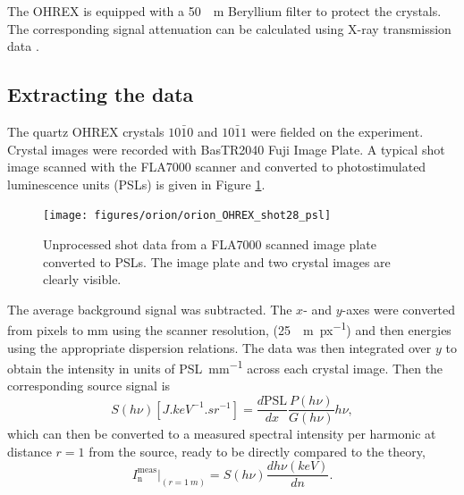 The OHREX is equipped with a \qty{50}{\mu m} Beryllium filter to protect the crystals. The corresponding signal attenuation can be calculated using X-ray transmission data \cite{henkeXRayInteractionsPhotoabsorption1993}.

\subsection{Extracting the data}
The quartz OHREX crystals $10\bar{1}0$ and $10\bar{1}1$ were fielded on the experiment. Crystal images were recorded with BasTR2040 Fuji Image Plate. A typical shot image scanned with the FLA7000 scanner and converted to photostimulated luminescence units (PSLs) is given in Figure \ref{fig:orionohrexshot28psl}.
\begin{figure}
	\centering
	\texttt{[image: figures/orion/orion\_OHREX\_shot28\_psl]}
	\caption[Unprocessed IP from ORION experiment]{Unprocessed shot data from a FLA7000 scanned image plate converted to PSLs. The image plate and two crystal images are clearly visible.}
	\label{fig:orionohrexshot28psl}
\end{figure}
The average background signal was subtracted. The $x$- and $y$-axes were converted from pixels to mm using the scanner resolution, (\qty{25}{\mu m.px^{-1}}) and then energies using the appropriate dispersion relations. The data was then integrated over $y$ to obtain the intensity in units of \unit{PSL.mm^{-1}} across each crystal image. Then the corresponding source signal is
\begin{equation}
	S(h\nu)[\unit{J.keV^{-1}.sr^{-1}}] = \frac{d\mathrm{PSL}}{dx}\frac{P(h\nu)}{G(h\nu)}h\nu,
\end{equation}
which can then be converted to a measured spectral intensity per harmonic at distance $r=1$ from the source, ready to be directly compared to the theory,
\begin{equation}
	I^\mathrm{meas}_\mathrm{n}|_{(r = \qty{1}{m})} = S(h\nu)\frac{dh\nu(keV)}{dn}.
\end{equation}

